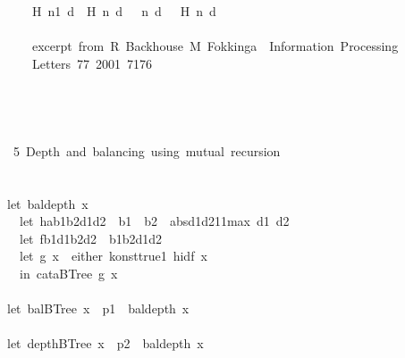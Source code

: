 \documentclass[a4paper]{article}
\begin{document}
\begin{tabbing}
\ttfamily ~~~~~H~n1~d~~H~n~d~~~n~d~~~H~n~d\\
\ttfamily ~~~~~\\
\ttfamily ~~~~~excerpt~from~R~Backhouse~M~Fokkinga~~Information~Processing\\
\ttfamily ~~~~~Letters~77~2001~7176\\
\ttfamily ~~~~~\\
\ttfamily ~\\
\ttfamily ~\\
\ttfamily ~\\
\ttfamily ~~5~Depth~and~balancing~using~mutual~recursion~\\
\ttfamily ~\\
\ttfamily ~\\
\ttfamily ~let~baldepth~x~~\\
\ttfamily ~~~let~hab1b2d1d2~~b1~~b2~~absd1d211max~d1~d2\\
\ttfamily ~~~let~fb1d1b2d2~~b1b2d1d2\\
\ttfamily ~~~let~g~x~~either~konsttrue1~hidf~x\\
\ttfamily ~~~in~cataBTree~g~x\\
\ttfamily ~\\
\ttfamily ~let~balBTree~x~~p1~~baldepth~x\\
\ttfamily ~\\
\ttfamily ~let~depthBTree~x~~p2~~baldepth~x\\

\end{tabbing}
\end{document}
